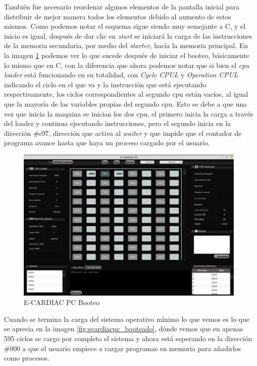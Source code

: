 \documentclass[letterpaper,12pt,oneside]{book}
\begin{document}
			También fue necesario reordenar algunos elementos de la pantalla inicial para distribuir de mejor manera todos los elementos debido
			al aumento de estos mismos. Como podemos notar el esquema sigue siendo muy semejante a C, y el inicio es igual, después de dar clic en
			\textit{start} se iniciará la carga de las instrucciones de la memoria secundaria, por medio del \textit{starter}, hacía la memoria principal.
			En la imagen \ref{fig:ecardiacpc_booteo} podemos ver lo que sucede después de iniciar el booteo, básicamente lo mismo que en C, con
			la diferencia que ahora podemos notar que si bien el \textit{cpu loader} está funcionando en su totalidad, con \textit{Cycle CPUL} y
			\textit{Operation CPUL} indicando el ciclo en el que va y la instrucción que está ejecutando respectivamente, los ciclos correspondientes
			al segundo cpu están vacíos, al igual que la mayoría de las variables propias del segundo cpu. Esto se debe a que una vez que inicia la maquina se inician
			los dos cpu, el primero inicia la carga  a través del loader y continua ejecutando instrucciones, pero el segundo inicia
			en la dirección \#s97, dirección que activa al \textit{waiter} y que impide que el contador de programa avance hasta que haya
			un proceso cargado por el usuario.

			
			\begin{figure}[h]		
				\centering
				\includegraphics[scale=0.35]{media/Paralela/ecardiacpc_booteo.png}
				\caption{ E-CARDIAC PC Booteo}
				\label{fig:ecardiacpc_booteo}
			\end{figure}	
			
			
			Cuando se termina la carga del sistema operativo mínimo lo que vemos es lo que se aprecia en la imagen \ref{fig:ecardiacpc_booteado}, dónde
			vemos que en apenas 595 ciclos se cargo por completo el sistema y ahora está esperando en la dirección \#000 a que el usuario empiece
			a cargar programas en memoria para añadirlos como procesos.
\end{document}
